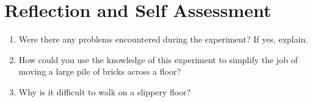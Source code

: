 \section{Reflection and Self Assessment}
\begin{enumerate}
\item Were there any problems encountered during the experiment? If yes, explain.
\item How could you use the knowledge of this experiment to simplify the job of moving a large pile of bricks across a floor?
\item Why is it difficult to walk on a slippery floor?
\end{enumerate}